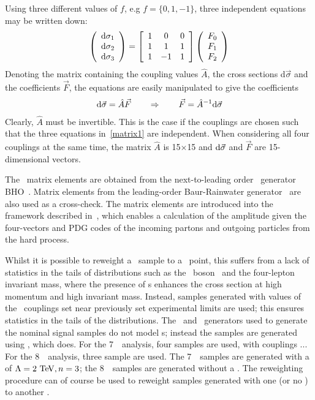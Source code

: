 Using three different values of $f$, e.g $f=\{0,1,-1\}$, three independent
equations may be written down:
\begin{eqnarray}\label{matrix1}
\left(\begin{array}{c}
{\rm d}\sigma_1\\
{\rm d}\sigma_2\\
{\rm d}\sigma_3
\end{array}\right) =
\left[\begin{array}{ccc}
1 & 0 & 0 \\
1 & 1 & 1 \\
1 & -1 & 1
\end{array}\right]
\left(\begin{array}{c}
F_0\\
F_1\\
F_2
\end{array}\right)
\end{eqnarray}
Denoting the matrix containing the coupling values $\hat{A}$, the cross sections
d$\vec{\sigma}$ and the coefficients $\vec{F}$, the equations are easily
manipulated to give the coefficients 
\begin{eqnarray}\label{matrix2} {\rm
d}\vec{\sigma}=\hat{A}\vec{F} \qquad \Rightarrow \qquad \vec{F}=\hat{A}^{-1}{\rm
d}\vec{\sigma} 
\end{eqnarray} 
Clearly, $\hat{A}$ must be invertible. This is the
case if the couplings are chosen such that the three equations in~\ref{matrix1}
are independent. When considering all four couplings at the same time, the
matrix $\hat{A}$ is 15$\times$15 and ${\rm d}\vec{\sigma}$ and $\vec{F}$ are
15-dimensional vectors.

The \TGC\ matrix elements are obtained from the next-to-leading order \mc\
generator BHO~\cite{bho}. Matrix elements from the leading-order Baur-Rainwater
generator~\cite{Baur:1994au} are also used as a cross-check. The matrix
elements are introduced into the  framework described in~\cite{Bella:2008wc},
which enables a calculation of the amplitude given the four-vectors and PDG
codes of the incoming partons and outgoing particles from the hard process. 

Whilst it is possible to reweight a \sm\ sample to a \TGC\ point, this suffers
from a lack of statistics in the tails of distributions such as the \Z\ boson \pt\ 
and the four-lepton invariant mass, where the presence of \TGC s
enhances the cross section at high momentum and high invariant mass. Instead,
samples generated with values of the \TGC\ couplings set near previously set
experimental limits are used; this ensures statistics in the tails of the
distributions. The \powhegbox\ and \ggZZ\ generators used to generate the nominal signal
samples do not model \TGC s; instead the samples are generated using \sherpa,
which does. For the 7~\tev\ analysis, four samples are used, with couplings
... For the 8~\tev\ analysis, three sample are used. The 7~\tev\ samples are
generated with a \formfactor of $\Lambda=2\tev,n=3$; the 8~\tev\ samples are
generated without a \formfactor. The reweighting procedure can of course be used to
reweight samples generated with one \formfactor (or no \formfactor) to another
\formfactor.

